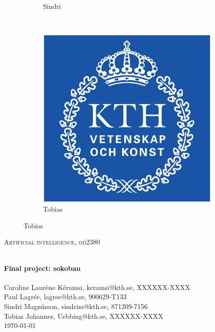 \documentclass[a4paper,10pt]{article}
\begin{document}
\begin{titlepage}
\begin{center}
\begin{figure}[h]
\begin{subfigure}[b]{0.2\textwidth}
                \caption{Sindri}
                \label{fig:Sindri}
        \end{subfigure}
          ~ %
        \begin{subfigure}[b]{0.2\textwidth}
                \centering
                \includegraphics[width=\textwidth]{kth_mathematics_rgb.jpg}
                \caption{Tobias}
                \label{fig:Tobias}
        \end{subfigure}
\end{figure}

\textsc{\Large Artificial intelligence, dd2380 }  %

\hrulefill \\[0.4cm]
{ \huge \bfseries Final project: sokoban}\\[0.4cm]
\hrulefill \\[1.5cm]



    Caroline Laurène Kéramsi, keramsi@kth.se, XXXXXX-XXXX \\
    Paul Lagrée, lagree@kth.se, 900629-T133 \\
    Sindri Magnússon, sindrim@kth.se, 871209-7156 \\
    Tobias Johannes, Uebbing@kth.se, XXXXXX-XXXX \\


\vfill
{\large \today}

\end{center}
\end{titlepage}
\end{document}
